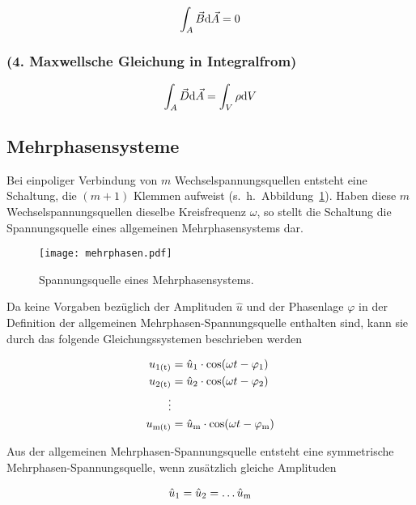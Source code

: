 \begin{align}
\int_A \vec{B}\mathrm{d}\vec{A} = 0
\end{align}

\subsubsection{(4. Maxwellsche Gleichung in Integralfrom)}

\begin{align}
\int_A \vec{D}\mathrm{d}\vec{A} = \int_V\rho\mathrm{d}V
\end{align}

\subsection{Mehrphasensysteme}
\label{subsec:mehrphasensysteme}

Bei einpoliger Verbindung von $m$ Wechselspannungsquellen entsteht eine Schaltung, die $(m+1)$ Klemmen aufweist (s.~h.~Abbildung~\ref{fig:mehrphasen}).
Haben diese $m$ Wechselspannungsquellen dieselbe Kreisfrequenz $\omega$, so stellt die Schaltung die Spannungsquelle eines allgemeinen Mehrphasensystems dar.

\begin{figure}[!h]
\centering
\texttt{[image: mehrphasen.pdf]}
\label{fig:mehrphasen}
\caption{Spannungsquelle eines Mehrphasensystems.}
\end{figure}

Da keine Vorgaben bezüglich der Amplituden $\hat{u}$ und der Phasenlage $\varphi$ in der Definition der allgemeinen Mehrphasen-Spannungsquelle enthalten sind, kann sie \zB durch das folgende Gleichungssystemen beschrieben werden

\begin{align}
u_{\mathrm{1(t)}} &= \hat{u}_{\mathrm{1}} \cdot \cos(\omega t - \varphi_{\mathrm{1}}) \\
u_{\mathrm{2(t)}} &= \hat{u}_{\mathrm{2}} \cdot \cos(\omega t - \varphi_{\mathrm{2}}) \nonumber  \\
\vdots \nonumber \\
u_{\mathrm{m(t)}} &= \hat{u}_{\mathrm{m}} \cdot \cos(\omega t - \varphi_{\mathrm{m}}) \nonumber
\end{align}

Aus der allgemeinen Mehrphasen-Spannungsquelle entsteht eine symmetrische Mehrphasen-Spannungsquelle, wenn zusätzlich gleiche Amplituden

\begin{align*}
\hat{u}_{\mathrm{1}} = \hat{u}_{\mathrm{2}} = \ldots \hat{u}_{\mathrm{m}}
\end{align*}

